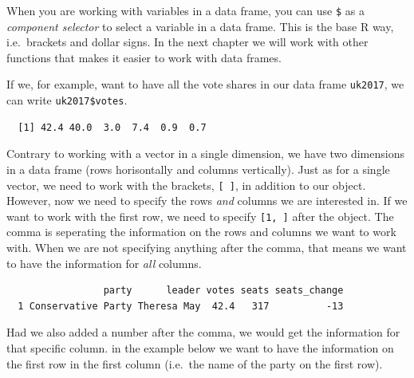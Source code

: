 \documentclass[12pt,oneside]{reedthesis}
\theoremstyle{definition}
\theoremstyle{definition}
\theoremstyle{definition}
\theoremstyle{remark}
\begin{document}
  When you are working with variables in a data frame, you can use
  \texttt{\$} as a \emph{component selector} to select a variable in a
  data frame. This is the base R way, i.e.~brackets and dollar signs. In
  the next chapter we will work with other functions that makes it easier
  to work with data frames.
  
  If we, for example, want to have all the vote shares in our data frame
  \texttt{uk2017}, we can write \texttt{uk2017\$votes}.
  \begin{Shaded}
  \begin{Highlighting}[]
  \OperatorTok{$}
  \end{Highlighting}
  \end{Shaded}
  \begin{verbatim}
  [1] 42.4 40.0  3.0  7.4  0.9  0.7
  \end{verbatim}
  Contrary to working with a vector in a single dimension, we have two
  dimensions in a data frame (rows horisontally and columns vertically).
  Just as for a single vector, we need to work with the brackets,
  \texttt{{[}\ {]}}, in addition to our object. However, now we need to
  specify the rows \emph{and} columns we are interested in. If we want to
  work with the first row, we need to specify \texttt{{[}1,\ {]}} after
  the object. The comma is seperating the information on the rows and
  columns we want to work with. When we are not specifying anything after
  the comma, that means we want to have the information for \emph{all}
  columns.
  \begin{Shaded}
  \begin{Highlighting}[]
  \NormalTok{uk2017[}\NormalTok{,] }
  \end{Highlighting}
  \end{Shaded}
  \begin{verbatim}
                 party      leader votes seats seats_change
  1 Conservative Party Theresa May  42.4   317          -13
  \end{verbatim}
  Had we also added a number after the comma, we would get the information
  for that specific column. in the example below we want to have the
  information on the first row in the first column (i.e.~the name of the
  party on the first row).
  \begin{Shaded}
  \begin{Highlighting}[]
  \NormalTok{uk2017[}\NormalTok{, }\NormalTok{] }
  \end{Highlighting}
  \end{Shaded}
\end{document}
